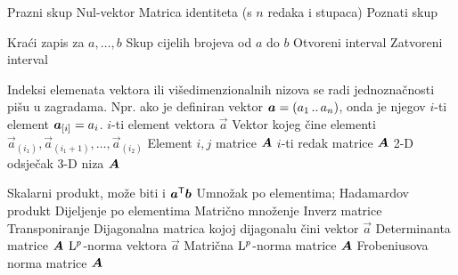  			{Prazni skup}
				{Nul-vektor}
	{Matrica identiteta (s $n$ redaka i stupaca)}
			{Poznati skup}

 			{Kraći zapis za $a,\dots, b$}
 {Skup cijelih brojeva od $a$ do $b$}
		{Otvoreni interval}
		{Zatvoreni interval}

{Indeksi elemenata vektora ili višedimenzionalnih nizova se radi jednoznačnosti pišu u zagradama. Npr. ako je definiran vektor $\vec a=(a_1\bidot a_n)$, onda je njegov $i$-ti element $\vec a_{\sbr{i}}=a_i$.}
	{$i$-ti element vektora $\vec{a}$}
	{Vektor kojeg čine elementi $\vec{a}_{(i_1)}, \vec{a}_{(i_1+1)},\dots, \vec{a}_{(i_2)}$}
	{Element $i,j$ matrice $\mat A$}
	{$i$-ti redak matrice $\mat A$}
	{2-D odsječak 3-D niza $\mat A$}

 {Skalarni produkt, može biti i $\vec{a}^\transpose\vec{b}$}
	{Umnožak po elementima; Hadamardov produkt}
 {Dijeljenje po elementima}
		{Matrično množenje}
			{Inverz matrice}
	{Transponiranje}
		{Dijagonalna matrica kojoj dijagonalu čini vektor $\vec a$}
		{Determinanta matrice $\mat A$}
	{$\mathrm{L}^p$-norma vektora $\vec a$}
	{Matrična $\mathrm{L}^p$-norma matrice $\mat A$}
	{Frobeniusova norma matrice $\mat A$}

